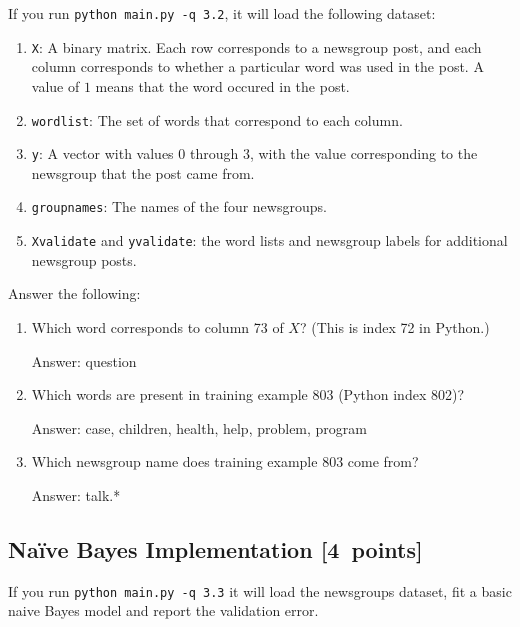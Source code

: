 \documentclass{article}
\newcommand{\blu}[1]{{\textcolor{blu}{#1}}}
\newenvironment{answer}{\par\begingroup\color{gre}Answer: }{\endgroup}
\let\ask\blu
\newcommand\pts[1]{\textcolor{pointscolour}{[#1~points]}}
\begin{document}
    If you run \texttt{python main.py -q 3.2}, it will load the following dataset:
    \begin{enumerate}
        \item \texttt{X}: A binary matrix. Each row corresponds to a newsgroup post, and each column corresponds to whether a particular word was used in the post. A value of $1$ means that the word occured in the post.
        \item \texttt{wordlist}: The set of words that correspond to each column.
        \item \texttt{y}: A vector with values $0$ through $3$, with the value corresponding to the newsgroup that the post came from.
        \item \texttt{groupnames}: The names of the four newsgroups.
        \item \texttt{Xvalidate} and \texttt{yvalidate}: the word lists and newsgroup labels for additional newsgroup posts.
    \end{enumerate}
    \ask{Answer the following}:
    \begin{enumerate}
        \item Which word corresponds to column 73 of $X$? (This is index 72 in Python.)
        \begin{answer}
            question
        \end{answer}
        \item Which words are present in training example 803 (Python index 802)?
        \begin{answer}
            case, children, health, help, problem, program
        \end{answer}
        \item Which newsgroup name does training example 803 come from?
        \begin{answer}
            talk.*
        \end{answer}
    \end{enumerate}

    \subsection{Na\"ive Bayes Implementation \pts{4}}

    If you run \texttt{python main.py -q 3.3}
    it will load the newsgroups dataset, fit a basic naive Bayes model and report the validation error.
\end{document}
